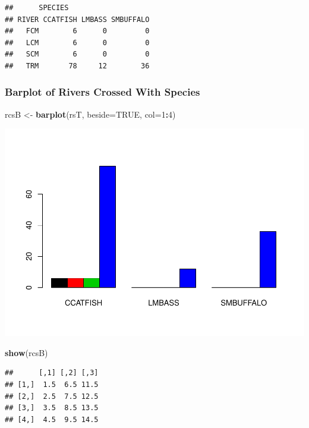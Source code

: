 \documentclass[]{article}
\newenvironment{Shaded}{\begin{snugshade}}{\end{snugshade}}
\newcommand{\KeywordTok}[1]{\textcolor[rgb]{0.13,0.29,0.53}{\textbf{#1}}}
\newcommand{\DataTypeTok}[1]{\textcolor[rgb]{0.13,0.29,0.53}{#1}}
\newcommand{\DecValTok}[1]{\textcolor[rgb]{0.00,0.00,0.81}{#1}}
\newcommand{\StringTok}[1]{\textcolor[rgb]{0.31,0.60,0.02}{#1}}
\newcommand{\OtherTok}[1]{\textcolor[rgb]{0.56,0.35,0.01}{#1}}
\newcommand{\OperatorTok}[1]{\textcolor[rgb]{0.81,0.36,0.00}{\textbf{#1}}}
\newcommand{\NormalTok}[1]{#1}
\begin{document}
\begin{verbatim}
##      SPECIES
## RIVER CCATFISH LMBASS SMBUFFALO
##   FCM        6      0         0
##   LCM        6      0         0
##   SCM        6      0         0
##   TRM       78     12        36
\end{verbatim}

\subsubsection{Barplot of Rivers Crossed With
Species}\label{barplot-of-rivers-crossed-with-species}

\begin{Shaded}
\begin{Highlighting}[]
\NormalTok{rcsB <-}\StringTok{ }\KeywordTok{barplot}\NormalTok{(rsT, }\DataTypeTok{beside=}\OtherTok{TRUE}\NormalTok{, }\DataTypeTok{col=}\DecValTok{1}\OperatorTok{:}\DecValTok{4}\NormalTok{)}
\end{Highlighting}
\end{Shaded}

\includegraphics{./tex2pdf.5760/333c4e8cffaeee24266632902ee4c266278fbdcd.pdf}

\begin{Shaded}
\begin{Highlighting}[]
\KeywordTok{show}\NormalTok{(rcsB)}
\end{Highlighting}
\end{Shaded}

\begin{verbatim}
##      [,1] [,2] [,3]
## [1,]  1.5  6.5 11.5
## [2,]  2.5  7.5 12.5
## [3,]  3.5  8.5 13.5
## [4,]  4.5  9.5 14.5
\end{verbatim}
\end{document}
